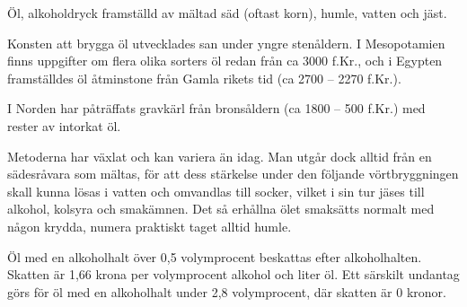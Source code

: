 \vspace{10pt}
\setlength{\parindent}{15pt}
Öl, alkoholdryck framställd av mältad säd (oftast korn), humle, vatten
och jäst.

Konsten att brygga öl utvecklades san under yngre
stenåldern. I Mesopotamien finns uppgifter om flera olika sorters öl
redan från ca 3000 f.Kr., och i Egypten framställdes öl åtminstone
från Gamla rikets tid (ca 2700 – 2270 f.Kr.).

I Norden har påträffats gravkärl från bronsåldern
(ca 1800 – 500 f.Kr.) med rester av intorkat öl.

Metoderna har växlat och kan variera än
idag. Man utgår dock alltid från en sädesråvara som mältas, för att
dess stärkelse under den följande vörtbryggningen skall kunna lösas i
vatten och omvandlas till socker, vilket i sin tur jäses till alkohol,
kolsyra och smakämnen. Det så erhållna ölet smaksätts normalt med
någon krydda, numera praktiskt taget alltid humle.

Öl med en alkoholhalt över 0,5 volymprocent beskattas efter
alkoholhalten. Skatten är 1,66 krona per volymprocent alkohol och
liter öl. Ett särskilt undantag görs för öl med en alkoholhalt under
2,8 volymprocent, där skatten är 0 kronor.
\setlength{\parindent}{0pt}
